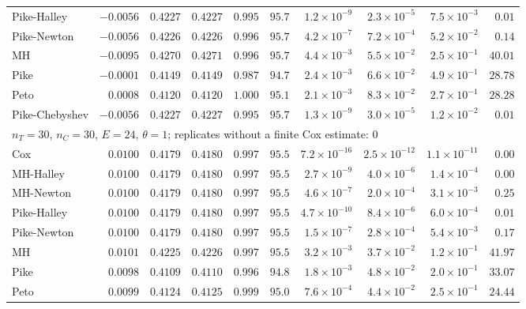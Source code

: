 \begin{landscape}
\begin{longtable}{lrrrrrrrrr}
Pike-Halley & $-0.0056$ & $0.4227$ & $0.4227$ & $0.995$ & $95.7$ & $1.2 \times 10^{-9}$ & $2.3 \times 10^{-5}$ & $7.5 \times 10^{-3}$ & $0.01$ \\
Pike-Newton & $-0.0056$ & $0.4226$ & $0.4226$ & $0.996$ & $95.7$ & $4.2 \times 10^{-7}$ & $7.2 \times 10^{-4}$ & $5.2 \times 10^{-2}$ & $0.14$ \\
MH & $-0.0095$ & $0.4270$ & $0.4271$ & $0.996$ & $95.7$ & $4.4 \times 10^{-3}$ & $5.5 \times 10^{-2}$ & $2.5 \times 10^{-1}$ & $40.01$ \\
Pike & $-0.0001$ & $0.4149$ & $0.4149$ & $0.987$ & $94.7$ & $2.4 \times 10^{-3}$ & $6.6 \times 10^{-2}$ & $4.9 \times 10^{-1}$ & $28.78$ \\
Peto & $0.0008$ & $0.4120$ & $0.4120$ & $1.000$ & $95.1$ & $2.1 \times 10^{-3}$ & $8.3 \times 10^{-2}$ & $2.7 \times 10^{-1}$ & $28.28$ \\
Pike-Chebyshev & $-0.0056$ & $0.4227$ & $0.4227$ & $0.995$ & $95.7$ & $1.3 \times 10^{-9}$ & $3.0 \times 10^{-5}$ & $1.2 \times 10^{-2}$ & $0.01$ \\
\multicolumn{10}{l}{$n_T = 30$, $n_C = 30$, $E = 24$, $\theta = 1$; replicates without a finite Cox estimate: 0} \\
Cox & $0.0100$ & $0.4179$ & $0.4180$ & $0.997$ & $95.5$ & $7.2 \times 10^{-16}$ & $2.5 \times 10^{-12}$ & $1.1 \times 10^{-11}$ & $0.00$ \\
MH-Halley & $0.0100$ & $0.4179$ & $0.4180$ & $0.997$ & $95.5$ & $2.7 \times 10^{-9}$ & $4.0 \times 10^{-6}$ & $1.4 \times 10^{-4}$ & $0.00$ \\
MH-Newton & $0.0100$ & $0.4179$ & $0.4180$ & $0.997$ & $95.5$ & $4.6 \times 10^{-7}$ & $2.0 \times 10^{-4}$ & $3.1 \times 10^{-3}$ & $0.25$ \\
Pike-Halley & $0.0100$ & $0.4179$ & $0.4180$ & $0.997$ & $95.5$ & $4.7 \times 10^{-10}$ & $8.4 \times 10^{-6}$ & $6.0 \times 10^{-4}$ & $0.01$ \\
Pike-Newton & $0.0100$ & $0.4179$ & $0.4180$ & $0.997$ & $95.5$ & $1.5 \times 10^{-7}$ & $2.8 \times 10^{-4}$ & $5.4 \times 10^{-3}$ & $0.17$ \\
MH & $0.0101$ & $0.4225$ & $0.4226$ & $0.997$ & $95.5$ & $3.2 \times 10^{-3}$ & $3.7 \times 10^{-2}$ & $1.2 \times 10^{-1}$ & $41.97$ \\
Pike & $0.0098$ & $0.4109$ & $0.4110$ & $0.996$ & $94.8$ & $1.8 \times 10^{-3}$ & $4.8 \times 10^{-2}$ & $2.0 \times 10^{-1}$ & $33.07$ \\
Peto & $0.0099$ & $0.4124$ & $0.4125$ & $0.999$ & $95.0$ & $7.6 \times 10^{-4}$ & $4.4 \times 10^{-2}$ & $2.5 \times 10^{-1}$ & $24.44$ \\

\end{longtable}
\end{landscape}
